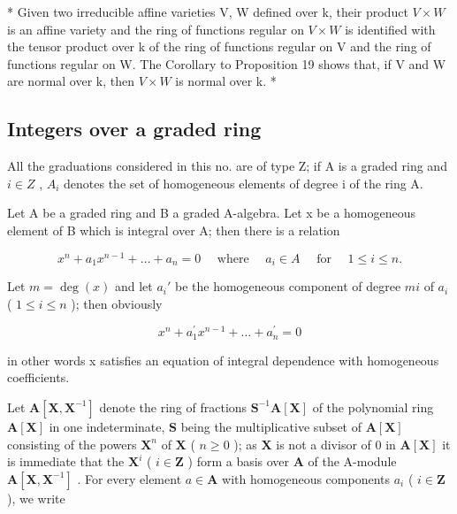 * Given two irreducible affine varieties V, W defined over k, their product \(V \times W\) is an affine variety and the ring of functions regular on \(V \times W\) is identified with the tensor product over k of the ring of functions regular on V and the ring of functions regular on W. The Corollary to Proposition 19 shows that, if V and W are normal over k, then \(V \times W\) is normal over k. *

\subsection{Integers over a graded ring}

All the graduations considered in this no. are of type Z; if A is a graded ring and \(i \in Z\) , \(A_{i}\) denotes the set of homogeneous elements of degree i of the ring A.

Let A be a graded ring and B a graded A-algebra. Let x be a homogeneous element of B which is integral over A; then there is a relation

\[
x ^ {n} + a _ {1} x ^ {n - 1} + \dots + a _ {n} = 0 \quad \text { where } \quad a _ {i} \in A \quad \text { for } \quad 1 \leqslant i \leqslant n.\tag{3}
\]

Let \(m = \deg(x)\) and let \(a_i'\) be the homogeneous component of degree \(mi\) of \(a_i\) ( \(1 \leqslant i \leqslant n\) ); then obviously

\[
x ^ {n} + a _ {1} ^ {\prime} x ^ {n - 1} + \dots + a _ {n} ^ {\prime} = 0\tag{4}
\]

in other words x satisfies an equation of integral dependence with homogeneous coefficients.

Let \(\mathbf{A}[\mathbf{X},\mathbf{X}^{-1}]\) denote the ring of fractions \(\mathbf{S}^{-1}\mathbf{A}[\mathbf{X}]\) of the polynomial ring \(\mathbf{A}[\mathbf{X}]\) in one indeterminate, \(\mathbf{S}\) being the multiplicative subset of \(\mathbf{A}[\mathbf{X}]\) consisting of the powers \(\mathbf{X}^n\) of \(\mathbf{X}\) ( \(n\geqslant 0\) ); as \(\mathbf{X}\) is not a divisor of 0 in \(\mathbf{A}[\mathbf{X}]\) it is immediate that the \(\mathbf{X}^i\) ( \(i\in \mathbf{Z}\) ) form a basis over \(\mathbf{A}\) of the A-module \(\mathbf{A}[\mathbf{X},\mathbf{X}^{-1}]\) . For every element \(a\in \mathbf{A}\) with homogeneous components \(a_{i}\) ( \(i\in \mathbf{Z}\) ), we write

